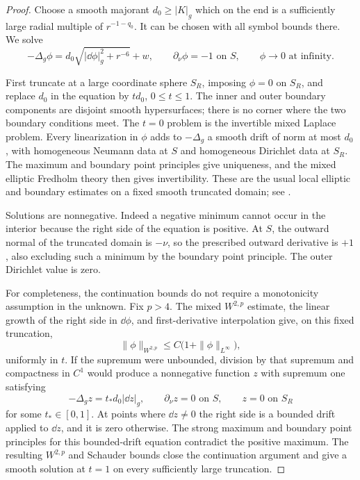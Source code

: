 \begin{proof}
Choose a smooth majorant $d_0\ge |K|_g$ which on the end is a sufficiently
large radial multiple of $r^{-1-q_0}$. It can be chosen with all symbol
bounds there. We solve
\begin{equation}
 -\Delta_g\phi
   =d_0\sqrt{|\dd\phi|_g^2+r^{-6}}+w,
 \qquad \partial_\nu\phi=-1\text{ on }S,
 \qquad \phi\longrightarrow0\text{ at infinity}.
\label{q4:var:phi-equation}
\end{equation}

First truncate at a large coordinate sphere $S_R$, imposing $\phi=0$ on
$S_R$, and replace $d_0$ in the equation by $t d_0$, $0\le t\le1$.
The inner and outer boundary components are disjoint smooth hypersurfaces;
there is no corner where the two boundary conditions meet. The $t=0$
problem is the invertible mixed Laplace problem. Every linearization in
$\phi$ adds to $-\Delta_g$ a smooth drift of norm at most $d_0$, with
homogeneous Neumann data at $S$ and homogeneous Dirichlet data at $S_R$.
The maximum and boundary point principles give uniqueness, and the mixed
elliptic Fredholm theory then gives invertibility. These are the usual
local elliptic and boundary estimates on a fixed smooth truncated domain;
see \cite{GilbargTrudinger2001}.

Solutions are nonnegative. Indeed a negative minimum cannot occur in the
interior because the right side of the equation is positive. At $S$, the
outward normal of the truncated domain is $-\nu$, so the prescribed
outward derivative is $+1$, also excluding such a minimum by the boundary
point principle. The outer Dirichlet value is zero.

For completeness, the continuation bounds do not require a monotonicity
assumption in the unknown. Fix $p>4$. The mixed $W^{2,p}$ estimate, the
linear growth of the right side in $\dd\phi$, and first-derivative
interpolation give, on this fixed truncation,
\[
 \|\phi\|_{W^{2,p}}\le C\bigl(1+\|\phi\|_{L^\infty}\bigr),
\]
uniformly in $t$. If the supremum were unbounded, division by that
supremum and compactness in $C^1$ would produce a nonnegative function
$z$ with supremum one satisfying
\[
 -\Delta_g z=t_*d_0|\dd z|_g,
 \qquad \partial_\nu z=0\text{ on }S,
 \qquad z=0\text{ on }S_R
\]
for some $t_*\in[0,1]$. At points where $\dd z\ne0$ the right side is a
bounded drift applied to $\dd z$, and it is zero otherwise. The strong
maximum and boundary point principles for this bounded-drift equation
contradict the positive maximum. The resulting $W^{2,p}$ and Schauder
bounds close the continuation argument and give a smooth solution at
$t=1$ on every sufficiently large truncation.


\end{proof}

